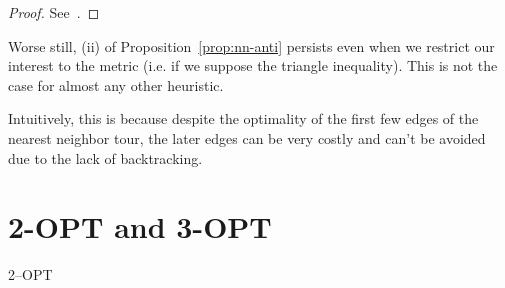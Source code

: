 \begin{proof}
    See~\cite{tsp-tour}.
\end{proof}

Worse still, (ii) of Proposition~\ref{prop:nn-anti} persists even when we restrict our interest to the metric \TSP{} (i.e. if we suppose the triangle inequality). This is not the case for almost any other heuristic.

Intuitively, this is because despite the optimality of the first few edges of the nearest neighbor tour, the later edges can be very costly and can't be avoided due to the lack of backtracking.



\section{2-OPT and 3-OPT}

\begin{algorithm}
    \caption{2--OPT}
    \label{algo:2-opt}


\end{algorithm}